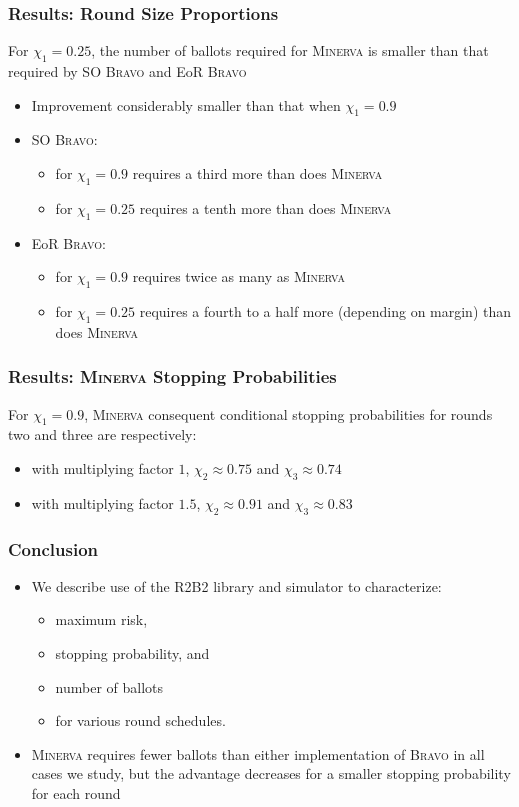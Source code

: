 \documentclass[aspectratio=169]{beamer}
\newcommand{\Minerva}{\textsc{Minerva}\xspace}
\newcommand{\BRAVO}{\textsc{Bravo}\xspace}
\begin{document}
\begin{frame}
\frametitle{Results: Round Size Proportions}

For $\chi_1 = 0.25$, the number of ballots required for \Minerva is smaller than that required by SO \BRAVO and EoR \BRAVO
\pause 
\begin{itemize}
\item Improvement considerably smaller than that when $\chi_1=0.9$
\pause 
\item SO \BRAVO: 
\begin{itemize}
\item for $\chi_1 =0.9$ requires a third more than does \Minerva
\item for $\chi_1 = 0.25$ requires a tenth more than does \Minerva
\end{itemize}
\pause 
\item EoR \BRAVO:
\begin{itemize}
\item for $\chi_1 = 0.9$ requires twice as many as \Minerva
\item for $\chi_1 =0.25$ requires a fourth to a half more (depending on margin) than does \Minerva
\end{itemize}

\end{itemize}
\end{frame}
\begin{frame}
\frametitle{Results: \Minerva Stopping Probabilities}


For $\chi_1 = 0.9$, \Minerva consequent conditional stopping probabilities for rounds two and three are respectively:
\begin{itemize} 
\pause
\item with multiplying factor $1$, $\chi_2\approx 0.75$ and $\chi_3\approx 0.74$
\pause
\item with multiplying factor $1.5$, $\chi_2\approx 0.91$ and $\chi_3\approx 0.83$
\end{itemize}

\end{frame}

\begin{frame}
\frametitle{Conclusion}

\begin{itemize}

\item We describe use of the R2B2 library and simulator to characterize: 
\begin{itemize}
\pause
\item maximum risk, 
\pause
\item stopping probability, and 
\pause
\item number of ballots 
\pause
\item for various round schedules.
\pause
\end{itemize}
\item \Minerva requires fewer ballots than either implementation of \BRAVO in all cases we study, but the advantage decreases for a smaller stopping probability for each round

\end{itemize}

\end{frame}
\end{document}
